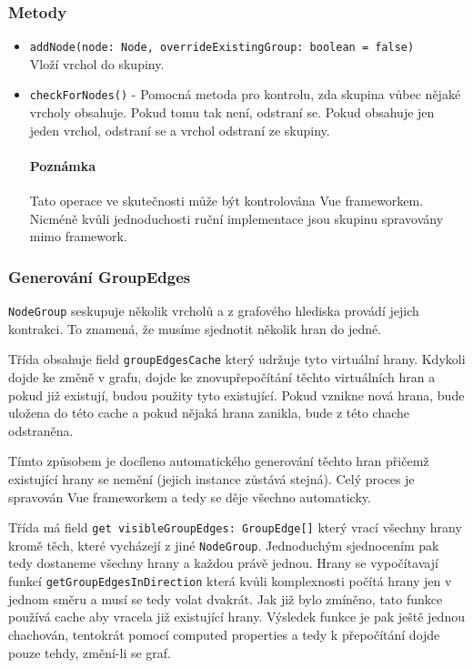 \subsubsection*{Metody}
\begin{itemize}
  \item \texttt{addNode(node: Node, overrideExistingGroup: boolean = false)}\mbox{}\\Vloží vrchol do skupiny.
  \item \texttt{checkForNodes()} - Pomocná metoda pro kontrolu, zda skupina vůbec nějaké vrcholy obsahuje. Pokud tomu tak není, odstraní se. Pokud obsahuje jen jeden vrchol, odstraní se a vrchol odstraní ze skupiny.
  \paragraph{Poznámka} Tato operace ve skutečnosti může být kontrolována Vue frameworkem. Nicméně kvůli jednoduchosti ruční implementace jsou skupinu spravovány mimo framework.
\end{itemize}

\subsubsection{Generování GroupEdges}
\texttt{NodeGroup} seskupuje několik vrcholů a z grafového hlediska provádí jejich kontrakci. To znamená, že musíme sjednotit několik hran do jedné.

Třída obsahuje field \texttt{groupEdgesCache} který udržuje tyto virtuální hrany. Kdykoli dojde ke změně v grafu, dojde ke znovupřepočítání těchto virtuálních hran a pokud již existují, budou použity tyto existující. Pokud vznikne nová hrana, bude uložena do této cache a pokud nějaká hrana zanikla, bude z této chache odstraněna.

Tímto způsobem je docíleno automatického generování těchto hran přičemž existující hrany se nemění (jejich instance zůstává stejná). Celý proces je spravován Vue frameworkem a tedy se děje všechno automaticky.

Třída má field \texttt{get visibleGroupEdges: GroupEdge[]} který vrací všechny hrany kromě těch, které vycházejí z jiné \texttt{NodeGroup}. Jednoduchým sjednocením pak tedy dostaneme všechny hrany a každou právě jednou. Hrany se vypočítavají funkcí \texttt{getGroupEdgesInDirection} která kvůli komplexnosti počítá hrany jen v jednom směru a musí se tedy volat dvakrát. Jak již bylo zmíněno, tato funkce používá cache aby vracela již existující hrany. Výsledek funkce je pak ještě jednou chachován, tentokrát pomocí computed properties a tedy k přepočítání dojde pouze tehdy, změní-li se graf.

